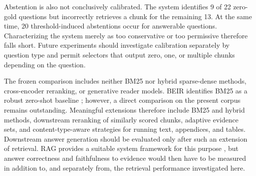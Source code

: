 \documentclass[11pt]{article}
\begin{document}
Abstention is also not conclusively calibrated. The system identifies 9 of 22 zero-gold questions but incorrectly retrieves a chunk for the remaining 13. At the same time, 20 threshold-induced abstentions occur for answerable questions. Characterizing the system merely as too conservative or too permissive therefore falls short. Future experiments should investigate calibration separately by question type and permit selectors that output zero, one, or multiple chunks depending on the question.

The frozen comparison includes neither BM25 nor hybrid sparse-dense methods, cross-encoder reranking, or generative reader models. BEIR identifies BM25 as a robust zero-shot baseline \citep{thakur2021beir}; however, a direct comparison on the present corpus remains outstanding. Meaningful extensions therefore include BM25 and hybrid methods, downstream reranking of similarly scored chunks, adaptive evidence sets, and content-type-aware strategies for running text, appendices, and tables. Downstream answer generation should be evaluated only after such an extension of retrieval. RAG provides a suitable system framework for this purpose \citep{lewis2020rag}, but answer correctness and faithfulness to evidence would then have to be measured in addition to, and separately from, the retrieval performance investigated here.


\end{document}
